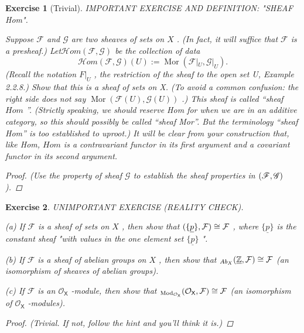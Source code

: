 \documentclass{article}
\theoremstyle{breakstyle}
\newtheorem{exercise}{Exercise}[section]
\let\hom\relax
\DeclareMathOperator{\hom}{Hom}
\begin{document}
\begin{exercise}[Trivial]
IMPORTANT EXERCISE AND DEFINITION: "SHEAF Hom".

Suppose $\mathcal{F}$ and $\mathcal{G}$ are two sheaves of sets on $X$ . (In
fact, it will suffice that $\mathcal{F}$ is a presheaf.)
Let$\mathcal{H}om(\mathcal{F},\mathcal{G})$ be the collection of data
$$
\mathcal {H} o m (\mathcal {F}, \mathcal {G}) (U) := \operatorname{Mor}
(\mathcal {F} | _ {U}, \mathcal {G} | _ {U}).
$$
(Recall the notation $F|_{U}$ , the restriction of the sheaf to the open set U,
Example 2.2.8.) Show that this is a sheaf of sets on X. (To avoid a common
confusion: the right side does not say $\operatorname{Mor}(\mathcal{F}(U),
\mathcal{G}(U))$ .) This sheaf is called “sheaf $Hom$ ”. (Strictly speaking, we
should reserve Hom for when we are in an additive category, so this should
possibly be called “sheaf Mor”. But the terminology “sheaf Hom” is too
established to uproot.) It will be clear from your construction that, like Hom,
$Hom$ is a contravariant functor in its first argument and a covariant functor
in its second argument.

\begin{proof}
    \emph{(Use the property of sheaf }$\mathscr{G}$\emph{ to establish the
    sheaf properties in }$\hom{(\mathscr{F},\mathscr{G})}$\emph{).}
\end{proof}

\end{exercise}

\begin{exercise}
UNIMPORTANT EXERCISE (REALITY CHECK).

(a) If $\mathcal{F}$ is a sheaf of sets on $X$ , then show that
$\hom(\{\underline{p}\}, \mathcal{F}) \cong \mathcal{F}$ , where
$\{\underline{p}\}$ is the constant sheaf "with values in the one element set
$\{\underline{p}\}$ ".  

(b) If $\mathcal{F}$ is a sheaf of abelian groups on $X$ , then show that
$\hom_{Ab_X}(\underline{\mathbb{Z}},\mathcal{F}) \cong \mathcal{F}$ (an
isomorphism of sheaves of abelian groups).  

(c) If $\mathcal{F}$ is an $\mathcal{O}_{\mathsf{X}}$ -module, then show that
$\hom_{\operatorname{Mod}_{\mathcal{O}_{\mathsf{X}}}}(\mathcal{O}_{\mathsf{X}},\mathcal{F})
\cong \mathcal{F}$ (an isomorphism of $\mathcal{O}_{\mathsf{X}}$ -modules).

\begin{proof}
    \emph{(Trivial. If not, follow the hint and you'll think it is.)}
\end{proof}

\end{exercise}
\end{document}

